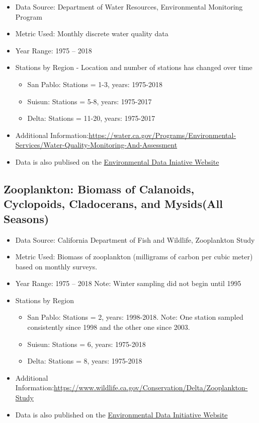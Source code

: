 \documentclass[
]{book}
\providecommand{\tightlist}{%
  \setlength{\itemsep}{0pt}\setlength{\parskip}{0pt}}
\begin{document}
\begin{itemize}
\tightlist
\item
  Data Source: Department of Water Resources, Environmental Monitoring Program
\item
  Metric Used: Monthly discrete water quality data
\item
  Year Range: 1975 -- 2018
\item
  Stations by Region - Location and number of stations has changed over time

  \begin{itemize}
  \tightlist
  \item
    San Pablo: Stations = 1-3, years: 1975-2018
  \item
    Suisun: Stations = 5-8, years: 1975-2017
  \item
    Delta: Stations = 11-20, years: 1975-2017
  \end{itemize}
\item
  Additional Information:\url{https://water.ca.gov/Programs/Environmental-Services/Water-Quality-Monitoring-And-Assessment}
\item
  Data is also publised on the \href{https://doi.org/10.6073/pasta/a215752cb9ac47f9ed9bb0fdb7fc7c19}{Environmental Data Iniative Website}
\end{itemize}

\hypertarget{zooplankton-biomass-of-calanoids-cyclopoids-cladocerans-and-mysidsall-seasons}{%
\subsection{Zooplankton: Biomass of Calanoids, Cyclopoids, Cladocerans, and Mysids(All Seasons)}\label{zooplankton-biomass-of-calanoids-cyclopoids-cladocerans-and-mysidsall-seasons}}

\begin{itemize}
\tightlist
\item
  Data Source: California Department of Fish and Wildlife, Zooplankton Study
\item
  Metric Used: Biomass of zooplankton (milligrams of carbon per cubic meter) based on monthly surveys.
\item
  Year Range: 1975 -- 2018 Note: Winter sampling did not begin until 1995
\item
  Stations by Region

  \begin{itemize}
  \tightlist
  \item
    San Pablo: Stations = 2, years: 1998-2018. Note: One station sampled consistently since 1998 and the other one since 2003.
  \item
    Suisun: Stations = 6, years: 1975-2018
  \item
    Delta: Stations = 8, years: 1975-2018
  \end{itemize}
\item
  Additional Information:\url{https://www.wildlife.ca.gov/Conservation/Delta/Zooplankton-Study}
\item
  Data is also published on the \href{https://portal.edirepository.org/nis/mapbrowse?packageid=edi.522.2}{Environmental Data Initiative Website}
\end{itemize}
\end{document}
